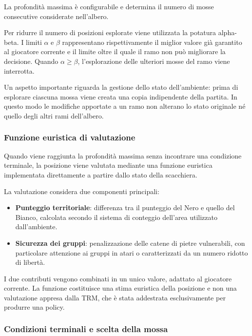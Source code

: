 La profondità massima è configurabile e determina il numero di mosse consecutive considerate nell'albero.

Per ridurre il numero di posizioni esplorate viene utilizzata la potatura alpha-beta. I limiti \(\alpha\) e \(\beta\) rappresentano rispettivamente il miglior valore già garantito al giocatore corrente e il limite oltre il quale il ramo non può migliorare la decisione. Quando \(\alpha\geq\beta\), l'esplorazione delle ulteriori mosse del ramo viene interrotta.

Un aspetto importante riguarda la gestione dello stato dell'ambiente: prima di esplorare ciascuna mossa viene creata una copia indipendente della partita. In questo modo le modifiche apportate a un ramo non alterano lo stato originale né quello degli altri rami dell'albero.

\subsubsection{Funzione euristica di valutazione}

Quando viene raggiunta la profondità massima senza incontrare una condizione terminale, la posizione viene valutata mediante una funzione euristica implementata direttamente a partire dallo stato della scacchiera.

La valutazione considera due componenti principali:

\begin{itemize}
    \item \textbf{Punteggio territoriale}: differenza tra il punteggio del Nero e quello del Bianco, calcolata secondo il sistema di conteggio dell'area utilizzato dall'ambiente.
    \item \textbf{Sicurezza dei gruppi}: penalizzazione delle catene di pietre vulnerabili, con particolare attenzione ai gruppi in atari o caratterizzati da un numero ridotto di libertà.
\end{itemize}

I due contributi vengono combinati in un unico valore, adattato al giocatore corrente. La funzione costituisce una stima euristica della posizione e non una valutazione appresa dalla TRM, che è stata addestrata esclusivamente per produrre una policy.

\subsubsection{Condizioni terminali e scelta della mossa}

